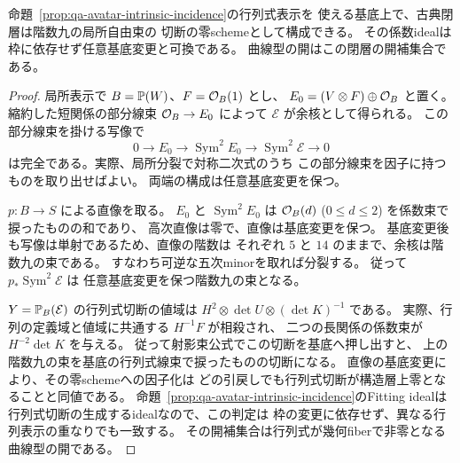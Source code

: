 \begin{corollary}[階数一表現の古典閉層を与える九つの係数]
\label{cor:qa-avatar-incidence-coefficient-bundle}
命題~\ref{prop:qa-avatar-intrinsic-incidence}の行列式表示を
使える基底上で、古典閉層は階数九の局所自由束の
切断の零schemeとして構成できる。
その係数idealは枠に依存せず任意基底変更と可換である。
曲線型の開はこの閉層の開補集合である。
\end{corollary}
\begin{proof}
局所表示で $B=\mathbb P(W)$、$F=\mathcal O_B(1)$ とし、
$E_0=(V\otimes F)\oplus\mathcal O_B$ と置く。
縮約した短関係の部分線束 $\mathcal O_B\to E_0$ によって
$\mathcal E$ が余核として得られる。
この部分線束を掛ける写像で
\[
 0\longrightarrow E_0\longrightarrow
       \operatorname{Sym}^2 E_0\longrightarrow
       \operatorname{Sym}^2\mathcal E\longrightarrow0
\]
は完全である。実際、局所分裂で対称二次式のうち
この部分線束を因子に持つものを取り出せばよい。
両端の構成は任意基底変更を保つ。

$p:B\to S$ による直像を取る。
$E_0$ と $\operatorname{Sym}^2 E_0$ は
$\mathcal O_B(d)$ ($0\le d\le2$) を係数束で捩ったものの和であり、
高次直像は零で、直像は基底変更を保つ。
基底変更後も写像は単射であるため、直像の階数は
それぞれ $5$ と $14$ のままで、余核は階数九の束である。
すなわち可逆な五次minorを取れば分裂する。
従って $p_*\operatorname{Sym}^2\mathcal E$ は
任意基底変更を保つ階数九の束となる。

$Y=\mathbb P_B(\mathcal E)$ の行列式切断の値域は
$H^2\otimes\det U\otimes(\det K)^{-1}$ である。
実際、行列の定義域と値域に共通する $H^{-1}F$ が相殺され、
二つの長関係の係数束が $H^{-2}\det K$ を与える。
従って射影束公式でこの切断を基底へ押し出すと、
上の階数九の束を基底の行列式線束で捩ったものの切断になる。
直像の基底変更により、その零schemeへの因子化は
どの引戻しでも行列式切断が構造層上零となることと同値である。
命題~\ref{prop:qa-avatar-intrinsic-incidence}のFitting idealは
行列式切断の生成するidealなので、この判定は
枠の変更に依存せず、異なる行列表示の重なりでも一致する。
その開補集合は行列式が幾何fiberで非零となる曲線型の開である。
\end{proof}


